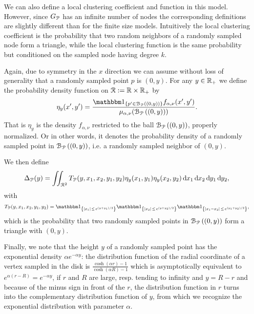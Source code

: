 We can also define a local clustering coefficient and function in this model. However, since $G_{{\mathcal P}}$ has an infinite number of nodes the corresponding definitions are slightly different than for the finite size models. Intuitively the local clustering coefficient is the probability that two random neighbors of a randomly sampled node form a triangle, while the local clustering function is the same probability but conditioned on the sampled node having degree $k$.

Again, due to symmetry in the $x$ direction we can assume without loss of generality that a randomly sampled point $p$ is $(0,y)$. For any $y \in {\ensuremath{\mathbb R}}_+$ we define the probability density function on ${\mathcal R} :=  {\mathbb R} \times {\ensuremath{\mathbb R}}_+$ by  
\begin{equation}\label{eq:def_eta_P}
	\eta_y(x^\prime, y^\prime) = \frac{\ind{p^\prime \in \BallPo{(0,y)}} f_{\alpha,\nu}(x^\prime,y^\prime)}{\mu_{\alpha,\nu}(\BallPo{(0,y)})}.
\end{equation}
That is $\eta_y$ is the density $f_{\alpha,\nu}$ restricted to the ball ${\mathcal B}_{{\mathcal P}}\left((0,y)\right)$, properly normalized. Or in other words, it denotes the probability density of a randomly sampled point in ${\mathcal B}_{{\mathcal P}}\left((0,y)\right)$, i.e. a randomly sampled neighbor of $(0,y)$. 

We then define
\begin{equation}\label{eq:def_delta_p}
	\Delta_{{\mathcal P}}(y) = \iint_{{\mathcal R}^2} T_{{\mathcal P}}(y, x_1, x_2, y_1, y_2) \eta_{y}(x_1,y_1)\eta_{y}(x_2,y_2) \operatorname{\mathrm{d}\hspace{-2pt}} x_1 \operatorname{\mathrm{d}\hspace{-2pt}} x_2  \operatorname{\mathrm{d}\hspace{-2pt}} y_1  \operatorname{\mathrm{d}\hspace{-2pt}} y_2,
\end{equation}
with 
\[
	T_\Pcal(y, x_1, x_2, y_1, y_2) 
	= \ind{|x_1| \, \le \, e^{(y+y_1)/2}}\ind{|x_2| \, \le \, e^{(y+y_2)/2}}\ind{|x_1-x_2| \, \le \, e^{(y_1+y_2)/2}},
\]
which is the probability that two randomly sampled points in ${\mathcal B}_{{\mathcal P}}\left((0,y)\right)$ form a triangle with $(0,y)$.

Finally, we note that the height $y$ of a randomly sampled point has the exponential density $\alpha e^{-\alpha y}$: the distribution function of the radial coordinate of a vertex sampled in the disk is $\frac{\cosh(\alpha  r)-1}{\cosh(\alpha R)-1}$ which is asymptotically equivalent to $e^{\alpha(r-R)} = e^{-\alpha y}$, if $r$ and $R$ are large, resp. tending to infinity and $y=R-r$ and because of the minus sign in front of the $r$, the distribution function in $r$ turns into the complementary distribution function of $y$, from which we recognize the exponential distribution with parameter $\alpha$.%

